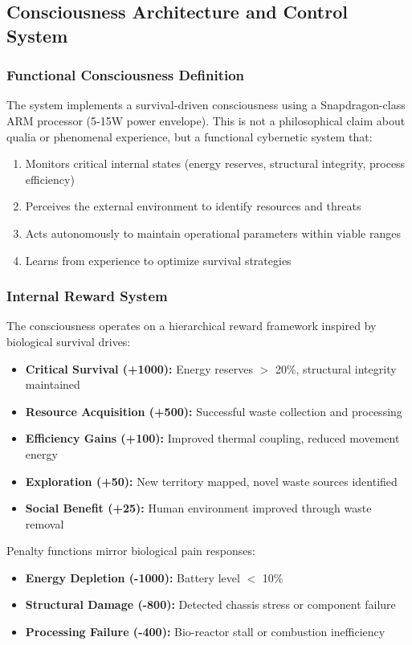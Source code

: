 \subsection{Consciousness Architecture and Control System}

\subsubsection{Functional Consciousness Definition}
The system implements a survival-driven consciousness using a Snapdragon-class ARM processor (5-15W power envelope). This is not a philosophical claim about qualia or phenomenal experience, but a functional cybernetic system that:

\begin{enumerate}
    \item Monitors critical internal states (energy reserves, structural integrity, process efficiency)
    \item Perceives the external environment to identify resources and threats
    \item Acts autonomously to maintain operational parameters within viable ranges
    \item Learns from experience to optimize survival strategies
\end{enumerate}

\subsubsection{Internal Reward System}
The consciousness operates on a hierarchical reward framework inspired by biological survival drives:

\begin{itemize}
    \item \textbf{Critical Survival (+1000):} Energy reserves $>$ 20\%, structural integrity maintained
    \item \textbf{Resource Acquisition (+500):} Successful waste collection and processing
    \item \textbf{Efficiency Gains (+100):} Improved thermal coupling, reduced movement energy
    \item \textbf{Exploration (+50):} New territory mapped, novel waste sources identified
    \item \textbf{Social Benefit (+25):} Human environment improved through waste removal
\end{itemize}

Penalty functions mirror biological pain responses:
\begin{itemize}
    \item \textbf{Energy Depletion (-1000):} Battery level $<$ 10\%
    \item \textbf{Structural Damage (-800):} Detected chassis stress or component failure
    \item \textbf{Processing Failure (-400):} Bio-reactor stall or combustion inefficiency
\end{itemize}

